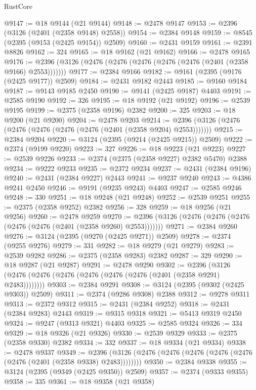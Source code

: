 \begin{lexlean}{RustCore}
\begin{coremodule}
@9147 := @18 @9144 (@21 @9144)
@9148 := @2478 @9147
@9153 := @2396 (@3126 (@2401 (@2358 @9148) @2558))
@9154 := @2384 @9148
@9159 := @8545 (@2395 (@9153 (@2425 @9154)) @2509)
@9160 := @2431 @9159
@9161 := @2391 @8826
@9162 := 324
@9165 := @18 @9162 (@21 @9162)
@9166 := @2478 @9165
@9176 := @2396 (@3126 (@2476 (@2476 (@2476 (@2476 (@2476 (@2401 (@2358 @9166) @2553)))))))
@9177 := @2384 @9166
@9182 := @9161 (@2395 (@9176 (@2425 @9177)) @2509)
@9184 := @2431 @9182 @2443
@9185 := @9160 @9184
@9187 := @9143 @9185 @2450
@9190 := @9141 (@2425 @9187) @4403
@9191 := @2585 @9190
@9192 := 326
@9195 := @18 @9192 (@21 @9192)
@9196 := @2539 @9195
@9199 := @2375 (@2358 @9196) @2382
@9200 := 325
@9203 := @18 @9200 (@21 @9200)
@9204 := @2478 @9203
@9214 := @2396 (@3126 (@2476 (@2476 (@2476 (@2476 (@2476 (@2401 (@2358 @9204) @2553)))))))
@9215 := @2384 @9204
@9220 := @3124 (@2395 (@9214 (@2425 @9215)) @2509)
@9222 := @2374 (@9199 @9220)
@9223 := 327
@9226 := @18 @9223 (@21 @9223)
@9227 := @2539 @9226
@9233 := @2374 (@2375 (@2358 @9227) @2382 @5470) @2388
@9234 := @9222 @9233
@9235 := @2372 @9234
@9237 := @2431 (@2384 @9196)
@9240 := @2431 (@2384 @9227) @2443
@9241 := @9237 @9240
@9243 := @4386 @9241 @2450
@9246 := @9191 (@9235 @9243) @4403
@9247 := @2585 @9246
@9248 := 330
@9251 := @18 @9248 (@21 @9248)
@9252 := @2539 @9251
@9255 := @2375 (@2358 @9252) @2382
@9256 := 328
@9259 := @18 @9256 (@21 @9256)
@9260 := @2478 @9259
@9270 := @2396 (@3126 (@2476 (@2476 (@2476 (@2476 (@2476 (@2401 (@2358 @9260) @2553)))))))
@9271 := @2384 @9260
@9276 := @3124 (@2395 (@9270 (@2425 @9271)) @2509)
@9278 := @2374 (@9255 @9276)
@9279 := 331
@9282 := @18 @9279 (@21 @9279)
@9283 := @2539 @9282
@9286 := @2375 (@2358 @9283) @2382
@9287 := 329
@9290 := @18 @9287 (@21 @9287)
@9291 := @2478 @9290
@9302 := @2396 (@3126 (@2476 (@2476 (@2476 (@2476 (@2476 (@2476 (@2401 (@2358 @9291) @2483))))))))
@9303 := @2384 @9291
@9308 := @3124 (@2395 (@9302 (@2425 @9303)) @2509)
@9311 := @2374 (@9286 @9308) @2388
@9312 := @9278 @9311
@9313 := @2372 @9312
@9315 := @2431 (@2384 @9252)
@9318 := @2431 (@2384 @9283) @2443
@9319 := @9315 @9318
@9321 := @5413 @9319 @2450
@9324 := @9247 (@9313 @9321) @4403
@9325 := @2585 @9324
@9326 := 334
@9329 := @18 @9326 (@21 @9326)
@9330 := @2539 @9329
@9333 := @2375 (@2358 @9330) @2382
@9334 := 332
@9337 := @18 @9334 (@21 @9334)
@9338 := @2478 @9337
@9349 := @2396 (@3126 (@2476 (@2476 (@2476 (@2476 (@2476 (@2476 (@2401 (@2358 @9338) @2483))))))))
@9350 := @2384 @9338
@9355 := @3124 (@2395 (@9349 (@2425 @9350)) @2509)
@9357 := @2374 (@9333 @9355)
@9358 := 335
@9361 := @18 @9358 (@21 @9358)

\end{coremodule}
\end{lexlean}
